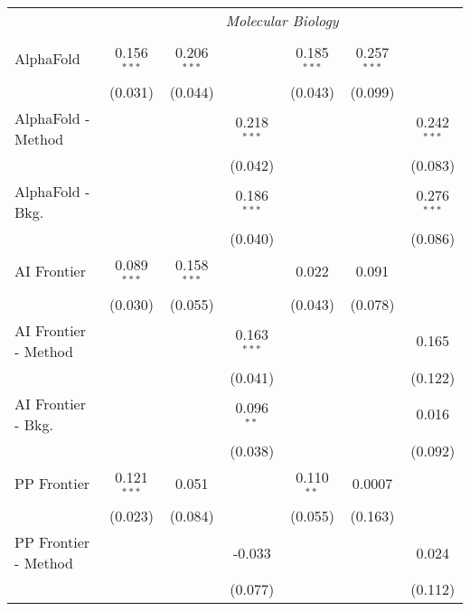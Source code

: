 \begin{tabular}{lcccccc}
 & \multicolumn{6}{c}{\textit{Molecular Biology}} \\ \\
   AlphaFold            & 0.156$^{***}$ & 0.206$^{***}$ &               & 0.185$^{***}$ & 0.257$^{***}$ &   \\   
                        & (0.031)       & (0.044)       &               & (0.043)       & (0.099)       &   \\   
   AlphaFold - Method   &               &               & 0.218$^{***}$ &               &               & 0.242$^{***}$\\   
                        &               &               & (0.042)       &               &               & (0.083)\\   
   AlphaFold - Bkg.     &               &               & 0.186$^{***}$ &               &               & 0.276$^{***}$\\   
                        &               &               & (0.040)       &               &               & (0.086)\\   
   AI Frontier          & 0.089$^{***}$ & 0.158$^{***}$ &               & 0.022         & 0.091         &   \\   
                        & (0.030)       & (0.055)       &               & (0.043)       & (0.078)       &   \\   
   AI Frontier - Method &               &               & 0.163$^{***}$ &               &               & 0.165\\   
                        &               &               & (0.041)       &               &               & (0.122)\\   
   AI Frontier - Bkg.   &               &               & 0.096$^{**}$  &               &               & 0.016\\   
                        &               &               & (0.038)       &               &               & (0.092)\\   
   PP Frontier          & 0.121$^{***}$ & 0.051         &               & 0.110$^{**}$  & 0.0007        &   \\   
                        & (0.023)       & (0.084)       &               & (0.055)       & (0.163)       &   \\   
   PP Frontier - Method &               &               & -0.033        &               &               & 0.024\\   
                        &               &               & (0.077)       &               &               & (0.112)\\   

\end{tabular}
